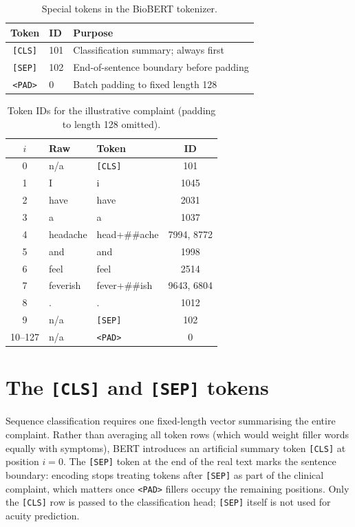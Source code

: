 \begin{table}[H]
\centering
\small
\begin{tabular}{|c|l|p{7.5cm}|}
\hline
\textbf{Token} & \textbf{ID} & \textbf{Purpose} \\
\hline
\texttt{[CLS]} & 101 & Classification summary; always first \\
\texttt{[SEP]} & 102 & End-of-sentence boundary before padding \\
\texttt{<PAD>} & 0 & Batch padding to fixed length 128 \\
\hline
\end{tabular}
\caption{Special tokens in the BioBERT tokenizer.}
\label{tab:special-tokens}
\end{table}

\begin{table}[H]
\centering
\scriptsize
\begin{tabular}{|c|l|l|c|}
\hline
\(i\) & Raw & Token & ID \\
\hline
0 & n/a & \texttt{[CLS]} & 101 \\
1 & I & i & 1045 \\
2 & have & have & 2031 \\
3 & a & a & 1037 \\
4 & headache & head+\#\#ache & 7994, 8772 \\
5 & and & and & 1998 \\
6 & feel & feel & 2514 \\
7 & feverish & fever+\#\#ish & 9643, 6804 \\
8 & . & . & 1012 \\
9 & n/a & \texttt{[SEP]} & 102 \\
10--127 & n/a & \texttt{<PAD>} & 0 \\
\hline
\end{tabular}
\caption{Token IDs for the illustrative complaint (padding to length 128 omitted).}
\label{tab:token-ids}
\end{table}

\section{The \texttt{[CLS]} and \texttt{[SEP]} tokens}
\label{sec:cls}

Sequence classification requires one fixed-length vector summarising the entire complaint. Rather than averaging all token rows (which would weight filler words equally with symptoms), BERT introduces an artificial summary token \texttt{[CLS]} at position \(i=0\). The \texttt{[SEP]} token at the end of the real text marks the sentence boundary: encoding stops treating tokens after \texttt{[SEP]} as part of the clinical complaint, which matters once \texttt{<PAD>} fillers occupy the remaining positions. Only the \texttt{[CLS]} row is passed to the classification head; \texttt{[SEP]} itself is not used for acuity prediction.

